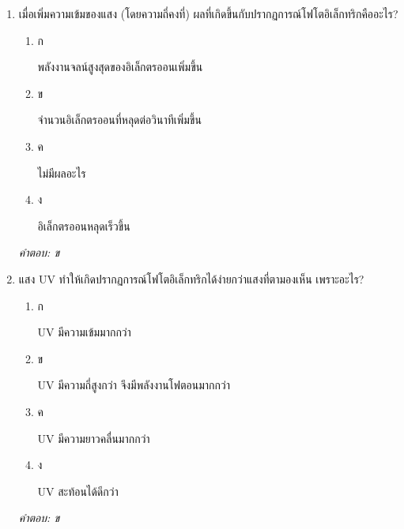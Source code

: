 \documentclass[12pt]{article}
\begin{document}
\begin{enumerate}[label=\arabic*., itemsep=0.5\baselineskip, topsep=0.5\baselineskip, leftmargin=*]
\item เมื่อเพิ่มความเข้มของแสง (โดยความถี่คงที่) ผลที่เกิดขึ้นกับปรากฏการณ์โฟโตอิเล็กทริกคืออะไร?
\begin{enumerate}[label=\alph*)., itemsep=0.3\baselineskip, topsep=0.3\baselineskip]
\item ก\ 
\begin{minipage}[t]{0.9\linewidth}
\raggedright พลังงานจลน์สูงสุดของอิเล็กตรออนเพิ่มขึ้น
\end{minipage}
\item ข\ 
\begin{minipage}[t]{0.9\linewidth}
\raggedright จำนวนอิเล็กตรออนที่หลุดต่อวินาทีเพิ่มขึ้น
\end{minipage}
\item ค\ 
\begin{minipage}[t]{0.9\linewidth}
\raggedright ไม่มีผลอะไร
\end{minipage}
\item ง\ 
\begin{minipage}[t]{0.9\linewidth}
\raggedright อิเล็กตรออนหลุดเร็วขึ้น
\end{minipage}
\end{enumerate}
\vspace{-0.3\baselineskip}
\begin{small}
\textit{คำตอบ: ข}
\end{small}

\item แสง UV ทำให้เกิดปรากฏการณ์โฟโตอิเล็กทริกได้ง่ายกว่าแสงที่ตามองเห็น เพราะอะไร?
\begin{enumerate}[label=\alph*)., itemsep=0.3\baselineskip, topsep=0.3\baselineskip]
\item ก\ 
\begin{minipage}[t]{0.9\linewidth}
\raggedright UV มีความเข้มมากกว่า
\end{minipage}
\item ข\ 
\begin{minipage}[t]{0.9\linewidth}
\raggedright UV มีความถี่สูงกว่า จึงมีพลังงานโฟตอนมากกว่า
\end{minipage}
\item ค\ 
\begin{minipage}[t]{0.9\linewidth}
\raggedright UV มีความยาวคลื่นมากกว่า
\end{minipage}
\item ง\ 
\begin{minipage}[t]{0.9\linewidth}
\raggedright UV สะท้อนได้ดีกว่า
\end{minipage}
\end{enumerate}
\vspace{-0.3\baselineskip}
\begin{small}
\textit{คำตอบ: ข}
\end{small}


\end{enumerate}
\end{document}

